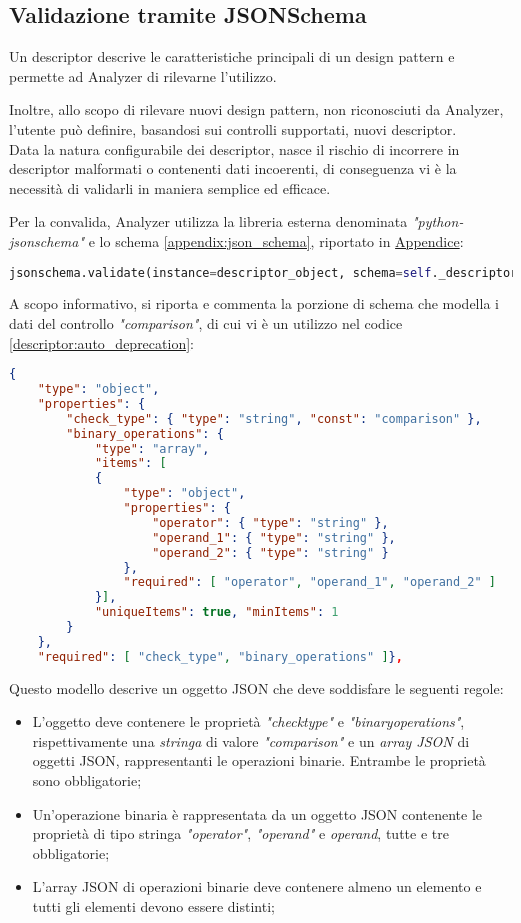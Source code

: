 \subsection{Validazione tramite JSONSchema}
Un descriptor descrive le caratteristiche principali di un design pattern e permette ad Analyzer di rilevarne l'utilizzo.\par 
Inoltre, allo scopo di rilevare nuovi design pattern, non riconosciuti da Analyzer, l'utente può definire, basandosi sui controlli supportati, nuovi descriptor.\\
\newline
Data la natura configurabile dei descriptor, nasce il rischio di incorrere in descriptor malformati o contenenti dati incoerenti, di conseguenza vi è la necessità di validarli in maniera semplice ed efficace.\par Per la convalida, Analyzer utilizza la libreria esterna denominata \textit{"python-jsonschema"} \cite{python-jsonschema} e lo schema \ref{appendix:json_schema}, riportato in \hyperref[appendix:codici]{Appendice}:
\begin{lstlisting}[language=Python, caption={Istruzione di validazione}]
jsonschema.validate(instance=descriptor_object, schema=self._descriptor_schema)
\end{lstlisting}
\noindent A scopo informativo, si riporta e commenta la porzione di schema che modella i dati del controllo \textit{"comparison"}, di cui vi è un utilizzo nel codice \ref{descriptor:auto_deprecation}:
{\begin{lstlisting}[language=json, caption={JSONSchema del controllo "comparison"}]
{
	"type": "object",
	"properties": { 
		"check_type": { "type": "string", "const": "comparison" },
		"binary_operations": {
			"type": "array",
			"items": [
			{
				"type": "object",
				"properties": { 
					"operator": { "type": "string" },
					"operand_1": { "type": "string" },
					"operand_2": { "type": "string" }
				},
				"required": [ "operator", "operand_1", "operand_2" ]
			}],
			"uniqueItems": true, "minItems": 1
		}
	},
	"required": [ "check_type", "binary_operations" ]},\end{lstlisting}}  
\noindent Questo modello descrive un oggetto JSON che deve soddisfare le seguenti regole:
\begin{itemize}
		\item {L'oggetto deve contenere le proprietà \textit{"check\textunderscore type"} e \textit{"binary\textunderscore operations"}, rispettivamente una \textit{stringa} di valore \textit{"comparison"} e un \textit{array JSON} di oggetti JSON, rappresentanti le operazioni binarie. Entrambe le proprietà sono obbligatorie;} 
		\item Un'operazione binaria è rappresentata da un oggetto JSON contenente le proprietà di tipo stringa \textit{"operator"}, \textit{"operand"} e \textit{operand}, tutte e tre obbligatorie;
		\item L'array JSON di operazioni binarie deve contenere almeno un elemento e tutti gli elementi devono essere distinti;
\end{itemize}
